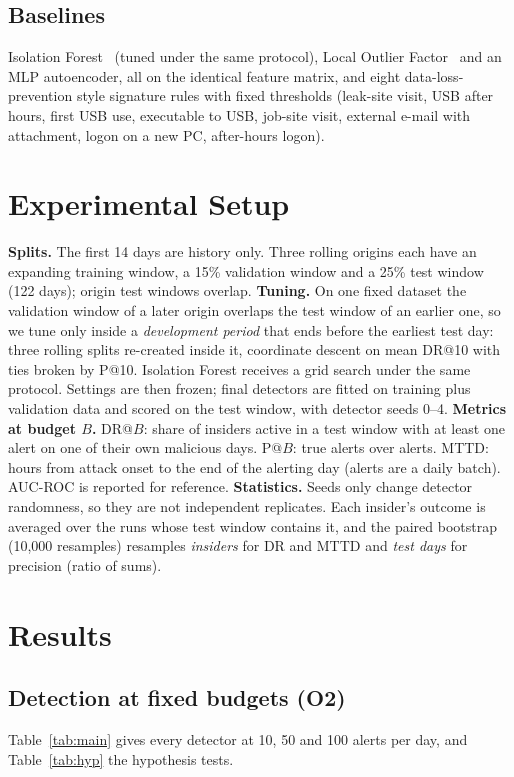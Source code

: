 \documentclass[conference]{IEEEtran}
\newcommand{\B}{\ensuremath{B}}
\begin{document}
\subsection{Baselines}
Isolation Forest~\cite{liu2008isolation} (tuned under the same protocol), Local Outlier
Factor~\cite{breunig2000lof} and an MLP autoencoder, all on the identical feature matrix, and eight
data-loss-prevention style signature rules with fixed thresholds (leak-site visit, USB after hours,
first USB use, executable to USB, job-site visit, external e-mail with attachment, logon on a new
PC, after-hours logon).

\section{Experimental Setup}
\textbf{Splits.} The first 14 days are history only. Three rolling origins each have an expanding
training window, a 15\% validation window and a 25\% test window (122 days); origin test windows
overlap.
\textbf{Tuning.} On one fixed dataset the validation window of a later origin overlaps the test
window of an earlier one, so we tune only inside a \emph{development period} that ends before the
earliest test day: three rolling splits re-created inside it, coordinate descent on mean DR@10 with
ties broken by P@10. Isolation Forest receives a grid search under the same protocol. Settings are
then frozen; final detectors are fitted on training plus validation data and scored on the test
window, with detector seeds 0--4.
\textbf{Metrics at budget \B.} DR@\B: share of insiders active in a test window with at least one
alert on one of their own malicious days. P@\B: true alerts over alerts. MTTD: hours from attack
onset to the end of the alerting day (alerts are a daily batch). AUC-ROC is reported for reference.
\textbf{Statistics.} Seeds only change detector randomness, so they are not independent
replicates. Each insider's outcome is averaged over the runs whose test window contains it, and
the paired bootstrap (10{,}000 resamples) resamples \emph{insiders} for DR and MTTD and
\emph{test days} for precision (ratio of sums).

\section{Results}
\subsection{Detection at fixed budgets (O2)}
Table~\ref{tab:main} gives every detector at 10, 50 and 100 alerts per day, and Table~\ref{tab:hyp}
the hypothesis tests.
\end{document}
